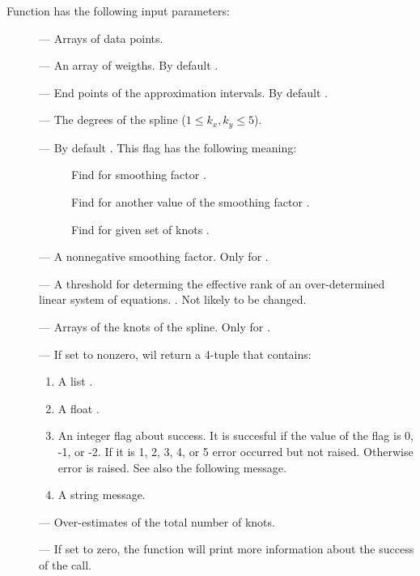 Function  has the following input parameters:
\begin{description}
\item[] --- Arrays of data points.
\item[] --- An array of weigths. By default
  .
\item[] --- End points of the approximation
  intervals. By default .
\item[] --- The degrees of the spline ($1\leqslant k_x,k_y
  \leqslant 5$).
\item[] --- By default . This flag has the
  following meaning:
  \begin{description}
  \item[] Find  for smoothing factor
    .
  \item[] Find  for another value of the
    smoothing factor .
  \item[] Find  for given set of knots .
  \end{description}
\item[] --- A nonnegative smoothing factor. Only for
  .
\item[] --- A threshold for determing the effective rank of an
  over-determined linear system of equations. . Not
  likely to be changed.
\item[] --- Arrays of the knots of the spline. Only for
  .
\item[] --- If set to nonzero,  wil
  return a 4-tuple that contains:
  \begin{enumerate}
  \item A list .
  \item A float .
  \item An integer flag about  success. It is succesful
    if the value of the flag is 0, -1, or -2. If it is 1, 2, 3, 4, or 5
    error occurred but not raised. Otherwise error is raised. See also
    the following message.
  \item A string message.
  \end{enumerate}
\item[] --- Over-estimates of the total number of
  knots.
\item[] --- If set to zero, the function will print more
  information about the success of the call.
\end{description}


